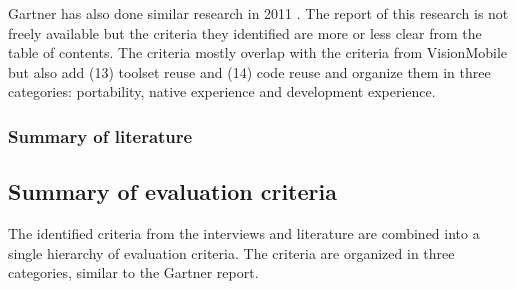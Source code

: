 Gartner has also done similar research in 2011 \cite{Gartner:CPT:2011}. The report of this research is not freely available but the criteria they identified are more or less clear from the table of contents. The criteria mostly overlap with the criteria from VisionMobile but also add (13) toolset reuse and (14) code reuse and organize them in three categories: portability, native experience and development experience.

\subsubsection*{Summary of literature}


\subsection*{Summary of evaluation criteria}

The identified criteria from the interviews and literature are combined into a single hierarchy of evaluation criteria. The criteria are organized in three categories, similar to the Gartner report.


